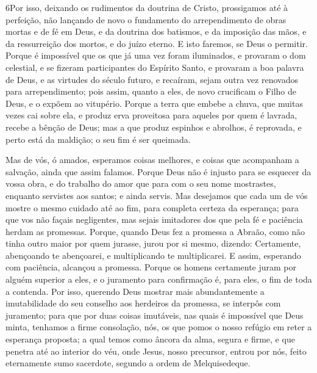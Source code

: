 \medskip

\lettrine{6} Por isso, deixando os rudimentos da doutrina de
Cristo, prossigamos até à perfeição, não lançando de novo o
fundamento do arrependimento de obras mortas e de fé em Deus, e
da doutrina dos batismos, e da imposição das mãos, e da ressurreição
dos mortos, e do juízo eterno. E isto faremos, se Deus o
permitir. Porque é impossível que os que já uma vez foram
iluminados, e provaram o dom celestial, e se fizeram participantes
do Espírito Santo, e provaram a boa palavra de Deus, e as
virtudes do século futuro, e recaíram, sejam outra vez renovados
para arrependimento; pois assim, quanto a eles, de novo crucificam o
Filho de Deus, e o expõem ao vitupério. Porque a terra que
embebe a chuva, que muitas vezes cai sobre ela, e produz erva
proveitosa para aqueles por quem é lavrada, recebe a bênção de Deus;
mas a que produz espinhos e abrolhos, é reprovada, e perto está
da maldição; o seu fim é ser queimada.

Mas de vós, ó amados, esperamos coisas melhores, e coisas que
acompanham a salvação, ainda que assim falamos. Porque Deus
não é injusto para se esquecer da vossa obra, e do trabalho do amor
que para com o seu nome mostrastes, enquanto servistes aos santos; e
ainda servis. Mas desejamos que cada um de vós mostre o mesmo
cuidado até ao fim, para completa certeza da esperança; para
que vos não façais negligentes, mas sejais imitadores dos que pela
fé e paciência herdam as promessas. Porque, quando Deus fez a
promessa a Abraão, como não tinha outro maior por quem jurasse,
jurou por si mesmo, dizendo: Certamente, abençoando te
abençoarei, e multiplicando te multiplicarei. E assim,
esperando com paciência, alcançou a promessa. Porque os
homens certamente juram por alguém superior a eles, e o juramento
para confirmação é, para eles, o fim de toda a contenda. Por
isso, querendo Deus mostrar mais abundantemente a imutabilidade do
seu conselho aos herdeiros da promessa, se interpôs com juramento;
para que por duas coisas imutáveis, nas quais é impossível
que Deus minta, tenhamos a firme consolação, nós, os que pomos o
nosso refúgio em reter a esperança proposta; a qual temos
como âncora da alma, segura e firme, e que penetra até ao interior
do véu, onde Jesus, nosso precursor, entrou por nós, feito
eternamente sumo sacerdote, segundo a ordem de Melquisedeque.

\medskip

